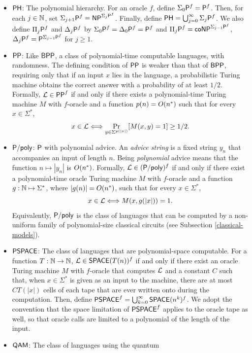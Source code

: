 \begin{itemize}
\item $\mathsf{PH}$: The polynomial hierarchy. For an oracle $f$, define
  $\Sigma_0\mathsf{P}^f=\mathsf{P}^f$. Then, for each $j\in\mathbb{N}$, set
  $\Sigma_{j+1}\mathsf{P}^f=\mathsf{NP}^{\Sigma_j\mathsf{P}^f}$. Finally, define
  $\mathsf{PH}=\bigcup_{j=0}^\infty\Sigma_j\mathsf{P}^f$. We also define $\Pi_j\mathsf{P}^f$ and
  $\Delta_j\mathsf{P}^f$ by $\Sigma_0\mathsf{P}^f=\Delta_0\mathsf{P}^f=\mathsf{P}^f$ and
  $\Pi_j\mathsf{P}^f=\mathsf{co}\mathsf{NP}^{\Sigma_{j-1}\mathsf{P}^f}$,
  $\Delta_j\mathsf{P}^f=\mathsf{P}^{\Sigma_{j-1}\mathsf{P}^f}$ for $j\geq 1$.
\item $\mathsf{PP}$: Like $\mathsf{BPP}$, a class of polynomial-time computable
  languages, with randomness. The defining condition of $\mathsf{PP}$ is weaker
  than that of $\mathsf{BPP}$, requiring only that if an input $x$ lies in the
  language, a probabilistic Turing machine obtains the correct answer with a
  probability of at least $1/2$. Formally, $\mathcal{L}\in\mathsf{PP}^f$ if and only if
  there exists a polynomial-time Turing machine $M$ with $f$-oracle and a
  function $p(n)=O(n^*)$ such that for every $x\in\Sigma^*$,
  \[
  x\in\mathcal{L}\Longleftrightarrow\Pr_{y\in\Sigma^{p(|x|)}}[M(x,y)=1]\geq 1/2.
  \]
\item $\mathsf{P}/\mathsf{poly}$: $\mathsf{P}$ with polynomial advice. An \textit{advice string}
  is a fixed string $y_n$ that accompanies an input of length $n$. Being
  \textit{polynomial} advice means that the function $n\mapsto|y_n|$ is
  $O(n^*)$. Formally, $\mathcal{L}\in(\mathsf{P}/\mathsf{poly})^f$ if and only if there exist a
  polynomial-time oracle Turing machine $M$ with $f$-oracle and a function
  $g:\mathbb{N}\mapsto\Sigma^*$, where $|g(n)|=O(n^*)$, such that for every
  $x\in\Sigma^*$,
  \[
  x\in\mathcal{L}\Longleftrightarrow M(x,g(|x|))=1.
  \]
  Equivalently, $\mathsf{P}/\mathsf{poly}$ is the class of languages that can be computed by a 
  non-uniform family of polynomial-size classical circuits (see Subsection 
  \ref{classical-models}).
\item $\mathsf{PSPACE}$: The class of languages that are polynomial-space
  computable. For a function $T:\mathbb{N}\rightarrow\mathbb{N}$, $\mathcal{L}\in\mathsf{SPACE}(T(n))^f$ if and
  only if there exist an oracle Turing machine $M$ with $f$-oracle that computes
  $\mathcal{L}$ and a constant $C$ such that, when $x\in\Sigma^*$ is given as an input
  to the machine, there are at most $CT(|x|)$ cells of each tape that are ever
  written onto during the computation. Then, define
  $\mathsf{PSPACE}^f=\bigcup_{k=0}^\infty\mathsf{SPACE}(n^k)^f$. We adopt the convention
  that the space limitation of $\mathsf{PSPACE}^f$ applies to the oracle tape as 
  well, so that oracle calls are limited to a polynomial of the length of the
  input.
\item $\mathsf{QAM}$: The class of languages using the quantum 

\end{itemize}
